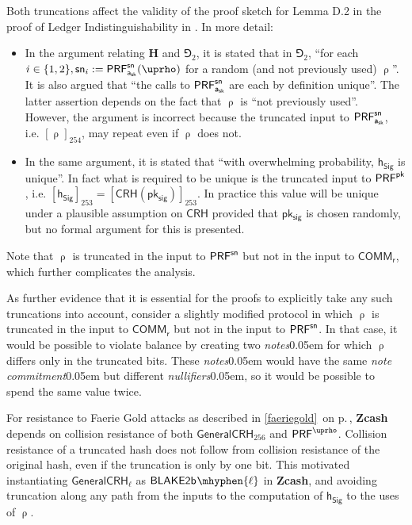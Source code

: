 \documentclass{article}
\renewcommand{\emph}[1]{\hspace{0.15em}{\fontfamily{pnc}\selectfont\scalebox{1.02}[0.999]{\textit{#1}}}\hspace{0.02em}}
\newcommand{\crossref}[1]{\autoref{#1}\, \emph{`\nameref*{#1}\kern -0.05em'} on p.\,\pageref*{#1}}
\newcommand{\term}[1]{\textsl{#1}\kern 0.05em\xspace}
\newcommand{\termbf}[1]{\textbf{#1}\xspace}
\newcommand{\Zcash}{\termbf{Zcash}}
\newcommand{\notes}{\term{notes}}
\newcommand{\noteCommitment}{\term{note commitment}}
\newcommand{\nullifiers}{\term{nullifiers}}
\newcommand{\GeneralCRH}[1]{\mathsf{GeneralCRH}_{#1}}
\newcommand{\CRH}{\mathsf{CRH}}
\newcommand{\Blake}[1]{\mathsf{BLAKE2b\kern 0.05em\mhyphen{#1}}}
\newcommand{\setof}[1]{\{{#1}\}}
\newcommand{\AuthPrivate}{\mathsf{a_{sk}}}
\newcommand{\pksig}{\mathsf{pk_{sig}}}
\newcommand{\PRF}[2]{\mathsf{{PRF}^{#2}_\mathnormal{#1}}}
\newcommand{\PRFsn}[1]{\PRF{#1}{sn}}
\newcommand{\PRFpk}[1]{\PRF{#1}{pk}}
\newcommand{\PRFrho}[1]{\PRF{#1}{\NoteAddressRand}}
\newcommand{\Commit}[1]{\mathsf{COMM}_{#1}}
\newcommand{\NoteCommitRand}{\mathsf{r}}
\newcommand{\NoteAddressRand}{\mathsf{\uprho}}
\newcommand{\hSig}{\mathsf{h_{Sig}}}
\begin{document}
Both truncations affect the validity of the proof sketch for Lemma D.2 in
the proof of Ledger Indistinguishability in \cite[Appendix D]{BCG+2014}.
In more detail:
\begin{itemize}
  \item In the argument relating $\mathbf{H}$ and $\Game_2$, it is stated that in $\Game_2$,
        ``for each $i \in \setof{1, 2}, \mathsf{sn}_i := \PRFsn{\AuthPrivate}(\NoteAddressRand)$
        for a random (and not previously used) $\NoteAddressRand$''. It is also
        argued that ``the calls to $\PRFsn{\AuthPrivate}$ are each by definition unique''.
        The latter assertion depends on the fact that $\NoteAddressRand$
        is ``not previously used''. However, the argument is incorrect
        because the truncated input to $\PRFsn{\AuthPrivate}$, i.e.
        $[\NoteAddressRand]_{254}$, may repeat even if $\NoteAddressRand$ does not.
  \item In the same argument, it is stated that ``with overwhelming probability,
        $\hSig$ is unique''. In fact what is required to be unique is the
        truncated input to $\PRFpk{}$, i.e. $[\hSig]_{253} = [\CRH(\pksig)]_{253}$.
        In practice this value will be unique under a plausible assumption on
        $\CRH$ provided that $\pksig$ is chosen randomly, but no formal argument
        for this is presented.
\end{itemize}

Note that $\NoteAddressRand$ is truncated in the input to $\PRFsn{}$
but not in the input to $\Commit{\NoteCommitRand}$, which further
complicates the analysis.

As further evidence that it is essential for the proofs to explicitly take any
such truncations into account, consider a slightly modified protocol in which
$\NoteAddressRand$ is truncated in the input to $\Commit{\NoteCommitRand}$
but not in the input to $\PRFsn{}$. In that case, it would be possible to
violate balance by creating two \notes for which $\NoteAddressRand$ differs
only in the truncated bits. These \notes would have the same \noteCommitment
but different \nullifiers, so it would be possible to spend the same value
twice.

For resistance to Faerie Gold attacks as described in
\crossref{faeriegold}, \Zcash depends on collision resistance of both
$\GeneralCRH{256}$ and $\PRFrho{}$. Collision resistance of a truncated hash
does not follow from collision resistance of the original hash, even if the
truncation is only by one bit. This motivated instantiating $\GeneralCRH{\ell}$
as $\Blake{\ell}$ in \Zcash, and avoiding truncation along any path from the
inputs to the computation of $\hSig$ to the uses of $\NoteAddressRand$.
\end{document}
